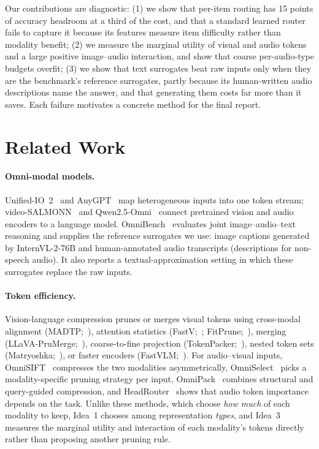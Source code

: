 \documentclass{article}
\begin{document}
Our contributions are diagnostic: (1) we show that per-item routing has 15 points of
accuracy headroom at a third of the cost, and that a standard learned router fails
to capture it because its features measure item difficulty rather than modality
benefit; (2) we measure the marginal utility of visual and audio tokens and a large
positive image--audio interaction, and show that coarse per-audio-type budgets
overfit; (3) we show that text surrogates beat raw inputs only when they are the
benchmark's reference surrogates, partly because its human-written audio descriptions
name the answer, and that
generating them costs far more than it saves. Each failure motivates a concrete
method for the final report.


\section{Related Work}
\label{sec:related}

\paragraph{Omni-modal models.} Unified-IO~2~\citep{lu2024unifiedio2} and
AnyGPT~\citep{zhan2024anygpt} map heterogeneous inputs into one token stream;
video-SALMONN~\citep{sun2024videosalmonn} and Qwen2.5-Omni~\citep{xu2025qwen25omni}
connect pretrained vision and audio encoders to a language model.
OmniBench~\citep{li2025omnibench} evaluates joint image--audio--text reasoning and
supplies the reference surrogates we use: image captions generated by
InternVL-2-76B and human-annotated audio transcripts (descriptions for non-speech
audio). It also reports a textual-approximation setting in which these surrogates
replace the raw inputs.

\paragraph{Token efficiency.} Vision-language
compression prunes or merges visual tokens using cross-modal alignment
(MADTP;~\citealp{cao2024madtp}), attention statistics
(FastV;~\citealp{chen2024fastv}; FitPrune;~\citealp{ye2025fitprune}), merging
(LLaVA-PruMerge;~\citealp{shang2025llavaprumerge}), coarse-to-fine projection
(TokenPacker;~\citealp{li2025tokenpacker}), nested token sets
(Matryoshka;~\citealp{cai2024matryoshka}), or faster encoders
(FastVLM;~\citealp{vasu2025fastvlm}). For audio--visual inputs,
OmniSIFT~\citep{ding2026omnisift} compresses the two modalities asymmetrically,
OmniSelect~\citep{yang2026omniselect} picks a modality-specific pruning strategy per
input, OmniPack~\citep{su2026omnipack} combines structural and query-guided
compression, and HeadRouter~\citep{he2026headrouter} shows that audio token
importance depends on the task. Unlike these methods, which choose \emph{how much}
of each modality to keep, Idea~1 chooses among representation \emph{types}, and
Idea~3 measures the marginal utility and interaction of each modality's tokens
directly rather than proposing another pruning rule.
\end{document}
